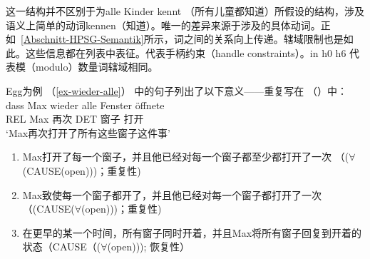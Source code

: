 这一结构并不区别于为alle Kinder kennt （所有儿童都知道）所假设的结构，涉及语义上简单的动词kennen（知道）。唯一的差异来源于涉及的具体动词。正如~\ref{Abschnitt-HPSG-Semantik}所示，词之间的关系向上传递。辖域限制也是如此。这些信息都在列表中表征。\hcons 代表手柄约束（handle constraints）。\qeq in h0 \qeq h6 代表模（modulo）数量词辖域相同。

Egg为例 （\ref{ex-wieder-alle}） 中的句子列出了以下意义——重复写在 （）中：
\ea
\label{ex-wieder-alle-zwei}
\gll dass Max wieder alle Fenster öffnete\\
	 REL Max 再次 DET 窗子 打开\\
\glt `Max再次打开了所有这些窗子这件事'
\z
\begin{enumerate}
\item Max打开了每一个窗子，并且他已经对每一个窗子都至少都打开了一次 （($\forall$(CAUSE(open)))；重复性)
\item Max致使每一个窗子都开了，并且他已经对每一个窗子都打开了一次 （(CAUSE($\forall$(open)))；重复性)
\item 在更早的某一个时间，所有窗子同时开着，并且Max将所有窗子回复到开着的状态（CAUSE（($\forall$(open))); 恢复性）
\end{enumerate}

